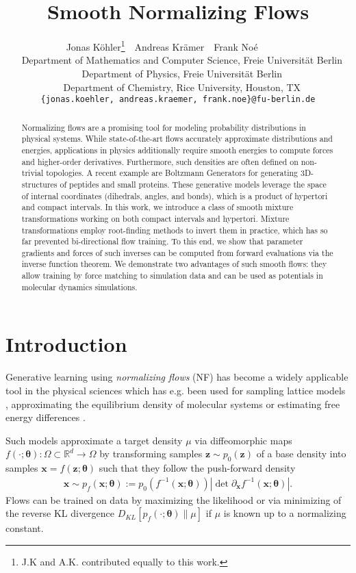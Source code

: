 \documentclass{article}
\title{Smooth Normalizing Flows}
\author{%
  Jonas Köhler\thanks{J.K and A.K. contributed equally to this work.}~~\footnotemark[2] \And Andreas Krämer\footnotemark[1]~~\footnotemark[2] \And Frank Noé~\footnotemark[2]~~\footnotemark[3]~~\footnotemark[4] \AND
  ~ \\
  \footnotemark[2] ~ Department of Mathematics and Computer Science, Freie Universität Berlin \\
  \footnotemark[3] ~ Department of Physics, Freie Universität Berlin \\
  \footnotemark[4] ~ Department of Chemistry, Rice University, Houston, TX \\
  \texttt{\{jonas.koehler, andreas.kraemer, frank.noe\}@fu-berlin.de}
  
}
\begin{document}
\maketitle




\begin{abstract}
Normalizing flows are a promising tool for modeling probability distributions in physical systems. While state-of-the-art flows accurately approximate distributions and energies, applications in physics additionally require smooth energies to compute forces and higher-order derivatives. Furthermore, such densities are often defined on non-trivial topologies. 
A recent example are Boltzmann Generators for generating 3D-structures of peptides and small proteins. These generative models leverage the space of internal coordinates (dihedrals, angles, and bonds), which is a product of hypertori and compact intervals. 
In this work, we introduce a class of smooth mixture transformations working on both compact intervals and hypertori.
Mixture transformations employ root-finding methods to invert them in practice, which has so far prevented bi-directional flow training. To this end, we show that parameter gradients and forces of such inverses can be computed from forward evaluations via the inverse function theorem.
We demonstrate two advantages of such smooth flows: they allow training by force matching to simulation data and can be used as potentials in molecular dynamics simulations. 
\end{abstract}
 
\section{Introduction}

Generative learning using \textit{normalizing flows} (NF) \cite{tabak2010density, rezende2015variational, papamakarios2019normalizing} has become a widely applicable tool in the physical sciences which has e.g. been used for sampling lattice models \cite{nicoli2020asymptotically, nicoli2021estimation, li2018neural, boyda2021sampling, albergo2019flow}, approximating the equilibrium density of molecular systems \cite{noe2019boltzmann, kohler2020equivariant, wu2020snf, xu2021learning} or estimating free energy differences \cite{wirnsberger2020targeted, ding2021deepbar}. 

Such models approximate a target density $\mu$ via diffeomorphic maps $f(\cdot; \bm \theta) \colon \Omega \subset \mathbb{R}^d \rightarrow \Omega$ by transforming samples $\bm z \sim p_{0}(\bm z)$ of a base density into samples $\bm x = f(\bm z; \bm \theta)$ such that they follow the push-forward density
\begin{align}
    \bm x \sim p_{f}(\bm x; \bm \theta) := p_{0}\left(f^{-1}(\bm x; \bm \theta)\right) \left|\det \partial_{\bm x} f^{-1}(\bm x; \bm \theta) \right|.
\end{align}
Flows can be trained on data by maximizing the likelihood or via minimizing of the reverse KL divergence $D_{KL}\left[p_{f}(\cdot; \bm \theta)\|\mu\right]$ if $\mu$ is known up to a normalizing constant.
\end{document}
